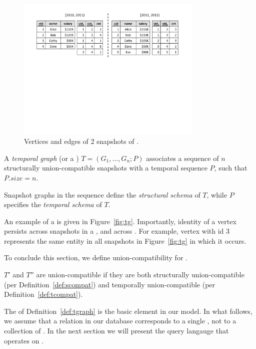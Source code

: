 \begin{figure}
\includegraphics[width=3.5in]{figs/2VE.pdf}
\caption{Vertices and edges of 2 snapshots of .}
\label{fig:2ve}
\end{figure}

\begin{definition} [TGraph]
A {\em temporal graph} (or a {\em \tg}) $T = (G_1, \ldots, G_n; P)$
  associates a sequence of $n$ structurally union-compatible snapshots
  with a temporal sequence $P$, such that $P.size = n$.
\label{def:tgraph} 
\end{definition}

Snapshot graphs in the sequence define the {\em structural schema} of
$T$, while $P$ specifies the {\em temporal schema} of $T$.  

An example of a \tg is given in Figure~\ref{fig:tg}.  Importantly,
identity of a vertex persists across snapshots in a \tg, and across
\tgs.  For example, vertex with id $3$ represents the same entity in
all snapshots in Figure~\ref{fig:tg} in which it occurs.


To conclude this section, we define union-compatibility for \tgs.

\begin{definition} 
\label{def:tuc} 
$T'$ and $T''$ are union-compatible \tgs if they are both structurally
union-compatible (per Definition~\ref{def:scompat}) and temporally
union-compatible (per Definition~\ref{def:tcompat}).
\end{definition}

The \tg of Definition~\ref{def:tgraph} is the basic element in our
model.  In what follows, we assume that a relation in our database
corresponds to a single \tg, not to a collection of \tgs.  In the next
section we will present the \ql query langauge that operates on \tgs.




